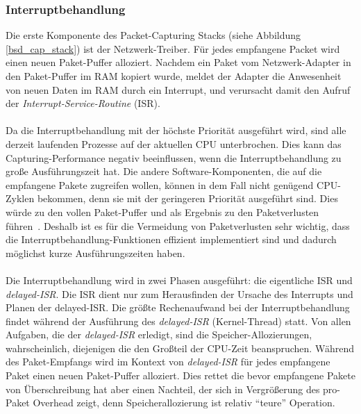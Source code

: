 \subsubsection{Interruptbehandlung}\label{sec:intr_behandlung}
Die erste Komponente des Packet-Capturing Stacks (siehe Abbildung
\ref{bsd_cap_stack}) ist der Netzwerk-Treiber. Für jedes empfangene Packet wird
einen neuen Paket-Puffer alloziert. Nachdem ein Paket vom Netzwerk-Adapter in
den Paket-Puffer im RAM kopiert wurde, meldet der Adapter die Anwesenheit von
neuen Daten im RAM durch ein Interrupt, und verursacht damit den Aufruf der
\emph{Interrupt-Service-Routine} (ISR).\\\\ 
%
Da die Interruptbehandlung mit der höchste Priorität ausgeführt wird, sind alle
derzeit laufenden Prozesse auf der aktuellen CPU unterbrochen. Dies kann das
Capturing-Performance negativ beeinflussen, wenn die Interruptbehandlung zu
große  Ausführungszeit hat. Die andere Software-Komponenten, die auf die
empfangene Pakete zugreifen wollen, können in dem Fall nicht genügend
CPU-Zyklen bekommen, denn sie mit der geringeren Priorität ausgeführt sind.
Dies würde zu den vollen Paket-Puffer und als Ergebnis zu den Paketverlusten
führen~\cite{elim_recv_lock}. Deshalb ist es für die Vermeidung von
Paketverlusten sehr wichtig, dass die Interruptbehandlung-Funktionen effizient
implementiert sind und dadurch möglichst kurze Ausführungszeiten haben.\\\\
%
Die Interruptbehandlung wird in zwei Phasen ausgeführt: die eigentliche ISR und
\emph{delayed-ISR}. Die ISR dient nur zum Herausfinden der Ursache des
Interrupts und Planen der delayed-ISR. Die größte Rechenaufwand bei der
Interruptbehandlung findet während der Ausführung des \emph{delayed-ISR}
(Kernel-Thread) statt. Von allen Aufgaben, die der \emph{delayed-ISR} erledigt,
sind die Speicher-Allozierungen, wahrscheinlich, diejenigen die den Großteil
der CPU-Zeit beanspruchen. Während des Paket-Empfangs wird im Kontext von
\emph{delayed-ISR} für jedes empfangene Paket einen neuen Paket-Puffer
alloziert. Dies rettet die bevor empfangene Pakete von Überschreibung hat aber
einen Nachteil, der sich in Vergrößerung des pro-Paket Overhead zeigt,
denn Speicherallozierung ist relativ ``teure'' Operation.
%
